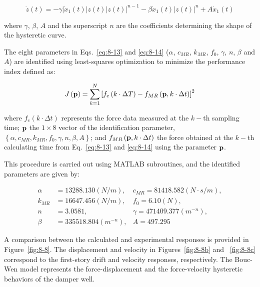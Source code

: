 \begin{equation}\label{eq:8-14}
\dot{z}(t) = -\gamma |\dot{x}_{1}(t)| z(t) |z(t)|^{n-1}-\beta\dot{x}_{1}(t)|z(t)|^{n}+A\dot{x}_{1}(t)
\end{equation}

where $\gamma$, $\beta$, $A$ and the superscript $n$ are the coefficients determining the shape of the hysteretic curve.

The eight parameters in Eqs.~\eqref{eq:8-13} and \eqref{eq:8-14} ($\alpha$, $c_{MR}$, $k_{MR}$, $f_{0}$, $\gamma$, $n$, $\beta$ and $A$) are identified using
least-squares optimization to minimize the performance index defined as:

\begin{equation}\label{eq:8-15}
J\left(\mathbf{p}\right) = \sum_{k=1}^{N}\left[f_{e}\left(k\cdot\Delta T \right) - f_{MR}\left(\mathbf{p}, k\cdot\Delta t \right)\right]^{2}
\end{equation}

where $f_{e}\left(k\cdot\Delta t\right)$ represents the force data measured at the $k-$th sampling time; $\mathbf{p}$ the $1\times8$ vector of the identification parameter, $\left\{ \alpha, c_{MR}, k_{MR}, f_{0}, \gamma, n, \beta, A \right\}$; and $f_{MR}\left(\mathbf{p},k\cdot\Delta t\right)$ the force obtained at the $k-$th calculating time from Eq.~\eqref{eq:8-13} and \eqref{eq:8-14} using the parameter $\mathbf{p}$.

This procedure is carried out using MATLAB subroutines\citep{coleman1999optimization}, and the identified parameters are given by:

\begin{equation}\label{eq:8-16}
\begin{aligned}
\alpha &=13288.130 (N/m), & c_{MR} = 81418.582 (N\cdot s/m), \\
k_{MR} &=16647.456 (N/m), & f_{0} = 6.10 (N), \\
n &= 3.0581, & \gamma = 471409.377 (m^{-n}),\\
\beta&=335518.804 (m^{-n}), & A=497.295
\end{aligned}
\end{equation}

A comparison between the calculated and experimental responses is provided in Figure~\ref{fig:8-8}. The displacement and velocity in Figures~\ref{fig:8-8b} and ~\ref{fig:8-8c} correspond to the first-story drift and velocity responses, respectively. The Bouc-Wen model represents the force-displacement and the force-velocity hysteretic behaviors of the damper well.

